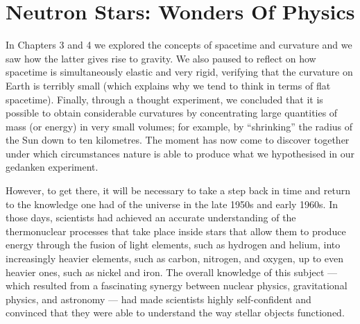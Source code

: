\chapter{Neutron Stars: Wonders Of Physics}\label{ch:05}

In Chapters 3 and 4 we explored the concepts of spacetime and curvature and we saw how
the latter gives rise to gravity. We also paused to reflect on how spacetime is
simultaneously elastic and very rigid, verifying that the curvature on Earth is terribly
small (which explains why we tend to think in terms of flat spacetime). Finally, through
a thought experiment, we concluded that it is possible to obtain considerable curvatures
by concentrating large quantities of mass (or energy) in very small volumes; for
example, by ``shrinking'' the radius of the Sun down to ten kilometres. The moment has
now come to discover together under which circumstances nature is able to produce what
we hypothesised in our gedanken experiment.

However, to get there, it will be necessary to take a step back in time and return to
the knowledge one had of the universe in the late 1950s and early 1960s. In those days,
scientists had achieved an accurate understanding of the thermonuclear processes that
take place inside stars that allow them to produce energy through the fusion of light
elements, such as hydrogen and helium, into increasingly heavier elements, such as
carbon, nitrogen, and oxygen, up to even heavier ones, such as nickel and iron. The
overall knowledge of this subject --- which resulted from a fascinating synergy between
nuclear physics, gravitational physics, and astronomy --- had made scientists highly
self-confident and convinced that they were able to understand the way stellar objects
functioned.

